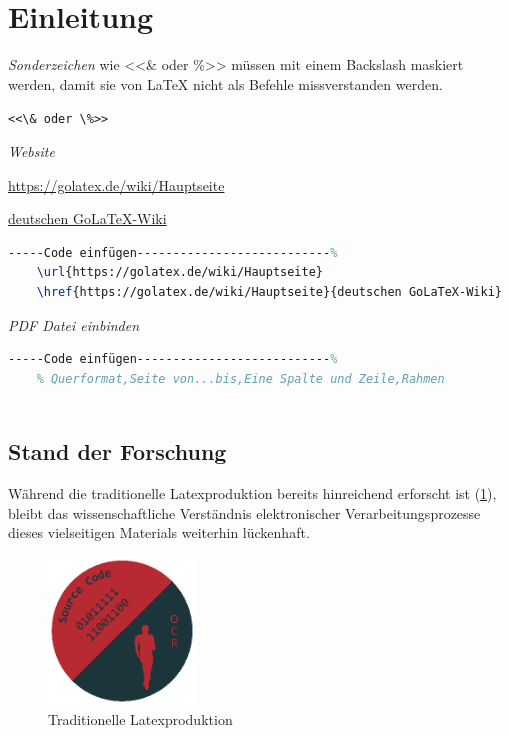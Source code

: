 \section*{Einleitung}

\emph{Sonderzeichen}  wie <<\& oder \%>> müssen mit einem Backslash maskiert werden, damit sie von LaTeX nicht als Befehle missverstanden werden.

\verb|<<\& oder \%>>| 

\emph{Website}

\url{https://golatex.de/wiki/Hauptseite} 

\href{https://golatex.de/wiki/Hauptseite}{deutschen GoLaTeX-Wiki}
\begin{lstlisting}[language=TeX,% C, TeX, Bash, Python
]-----Code einfügen---------------------------%
	\url{https://golatex.de/wiki/Hauptseite}
	\href{https://golatex.de/wiki/Hauptseite}{deutschen GoLaTeX-Wiki}
\end{lstlisting} 

\emph{PDF Datei einbinden}
\begin{lstlisting}[language=TeX,% C, TeX, Bash, Python
]-----Code einfügen---------------------------%
	% Querformat,Seite von...bis,Eine Spalte und Zeile,Rahmen
	
\end{lstlisting}



\clearpage
\subsection*{Stand der Forschung}

Während die traditionelle Latexproduktion bereits hinreichend erforscht ist (\ref{fig:latex}), bleibt das wissenschaftliche Verständnis elektronischer Verarbeitungsprozesse dieses vielseitigen Materials weiterhin lückenhaft. 


\begin{figure}[hb]
	\centering
	\includegraphics[width=0.35\textwidth]{images/logo.eps}
	\caption{Traditionelle Latexproduktion}\label{fig:latex}%
\end{figure}


